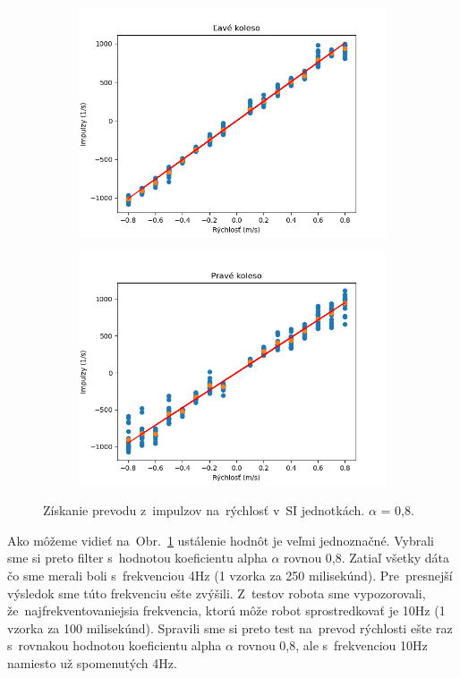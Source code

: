 \begin{figure}[!htbp]
	\begin{subfigure}{0.5\textwidth}
		\includegraphics[width=\textwidth]{img/lw_08250.png}
	\end{subfigure}
	\hfill
	\begin{subfigure}{0.5\textwidth}
		\includegraphics[width=\textwidth]{img/rw_08250.png}
	\end{subfigure}
	\caption{Získanie prevodu z~impulzov na~rýchlosť v~SI jednotkách. $\alpha$ = 0,8.}
	\label{fig:rw_lw_08250}
\end{figure}

Ako môžeme vidieť na~Obr.~\ref{fig:rw_lw_08250} ustálenie hodnôt je veľmi jednoznačné. Vybrali sme si preto filter s~hodnotou
koeficientu alpha $\alpha$ rovnou 0,8. Zatiaľ všetky dáta čo sme merali boli s~frekvenciou 4Hz (1 vzorka za 250 milisekúnd).
Pre~presnejší výsledok sme túto frekvenciu ešte zvýšili. Z~testov robota sme vypozorovali, že~najfrekventovaniejsia frekvencia,
ktorú môže robot sprostredkovať je 10Hz (1 vzorka za 100 milisekúnd). Spravili sme si preto test na~prevod rýchlosti ešte raz
s~rovnakou hodnotou koeficientu alpha $\alpha$ rovnou 0,8, ale s~frekvenciou 10Hz namiesto už spomenutých 4Hz.

